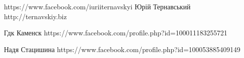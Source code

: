  
 
 
 
 

https://www.facebook.com/iuriiternavskyi
Юрій Тернавський
http://ternavskiy.biz






Гдк Каменск
https://www.facebook.com/profile.php?id=100011183255721

Надя Стацишина
https://www.facebook.com/profile.php?id=100053885409149

